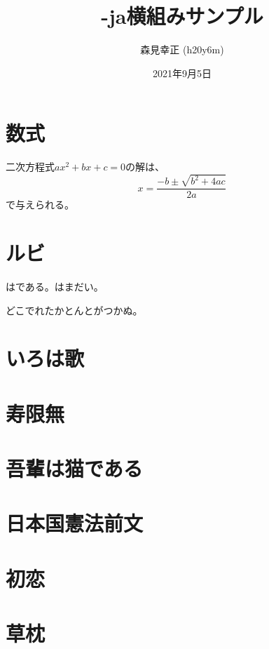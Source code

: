\documentclass[a4paper,twocolumn]{article}
\title{\XeLaTeX-ja横組みサンプル}
\author{森見幸正 (h20y6m)}
\date{2021年9月5日}
\begin{document}
\maketitle

\section{数式}

二次方程式$ax^2+bx+c=0$の解は、
\[ x = \frac{-b\pm\sqrt{b^2+4ac}}{2a} \]
で与えられる。

\section{ルビ}

はである。はまだい。

どこでれたかとんとがつかぬ。

\section{いろは歌}

\section{寿限無}

\section{吾輩は猫である}

\section{日本国憲法前文}

\section{初恋}

\section{草枕}
\end{document}
